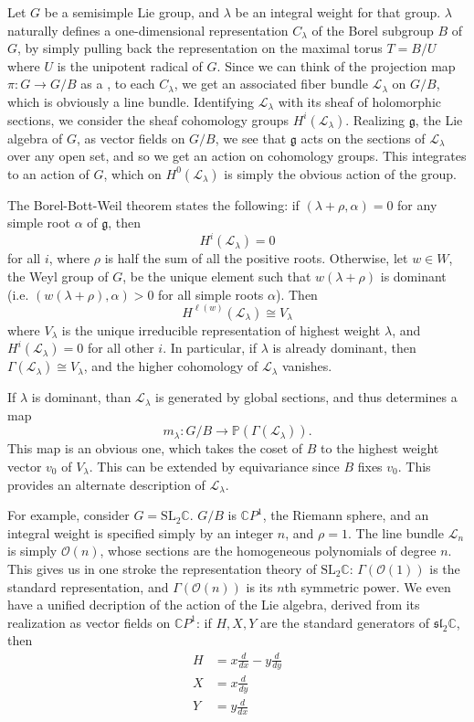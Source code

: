 \documentclass[12pt]{article}
\newcommand{\C}{\mathbb{C}}
\newcommand{\g}{\mathfrak{g}}
\renewcommand{\O}{\mathcal{O}}
\renewcommand{\L}{\mathcal{L}}
\begin{document}

Let $G$ be a semisimple Lie group, and $\lambda$ be an integral weight for that group. $\lambda$ naturally defines a one-dimensional representation $C_\lambda$ of the Borel subgroup $B$ of $G$, by simply pulling back the representation on the maximal torus $T=B/U$ where $U$ is the unipotent radical of $G$. Since we can think of the projection map $\pi\colon G\to G/B$ as a , to each $C_\lambda$, we get an associated fiber bundle $\L_\lambda$ on $G/B$, which is obviously a line bundle. Identifying $\L_\lambda$ with its sheaf of holomorphic sections, we consider the sheaf cohomology groups $H^i(\L_\lambda)$. Realizing $\g$, the Lie algebra of $G$, as vector fields on $G/B$, we see that $\g$ acts on the sections of $\L_\lambda$ over any open set, and so we get an action on cohomology groups. This integrates to an action of $G$, which on $H^0(\L_\lambda)$ is simply the obvious action of the group.

The Borel-Bott-Weil theorem states the following: if $(\lambda+\rho,\alpha)=0$ for any simple root $\alpha$ of $\g$, then $$H^i(\L_\lambda)=0$$ for all $i$, where $\rho$ is half the sum of all the positive roots. Otherwise, let $w\in W$, the Weyl group of $G$, be the unique element such that $w(\lambda+\rho)$ is dominant (i.e. $(w(\lambda+\rho),\alpha)>0$ for all simple roots $\alpha$).
Then $$H^{\ell(w)}(\L_\lambda)\cong V_\lambda$$ where $V_\lambda$ is the unique irreducible representation of highest weight $\lambda$, and $H^i(\L_\lambda)=0$ for all other $i$. In particular, if $\lambda$ is already dominant, then $\Gamma(\L_\lambda)\cong V_\lambda$, and the higher cohomology of $\L_\lambda$ vanishes.

If $\lambda$ is dominant, than $\L_\lambda$ is generated by global sections, and thus determines a map $$m_\lambda\colon G/B\to\mathbb{P}\left(\Gamma(\L_\lambda)\right).$$ This map is an obvious one, which takes the coset of $B$ to the highest weight vector $v_0$ of $V_\lambda$. This can be extended by equivariance since $B$ fixes $v_0$. This provides an alternate description of $\L_\lambda$.

For example, consider $G=\mathrm{SL}_2\C$. $G/B$ is $\C P^1$, the Riemann sphere, and an integral weight is specified simply by an integer $n$, and $\rho=1$. The line bundle $\L_n$ is simply $\O(n)$, whose sections are the homogeneous polynomials of degree $n$. This gives us in one stroke the representation theory of $\mathrm{SL}_2\C$: $\Gamma(\O(1))$ is the standard representation, and $\Gamma(\O(n))$ is its $n$th symmetric power. We even have
a unified decription of the action of the Lie algebra, derived from its realization as vector fields on $\C P^1$: if $H,X,Y$ are the standard generators of $\mathfrak{sl}_2\C$, then
\begin{align*}
H&=x\frac{d}{dx}-y\frac{d}{dy}\\
X&=x\frac{d}{dy}\\
Y&=y\frac{d}{dx}\\
\end{align*}
\end{document}
